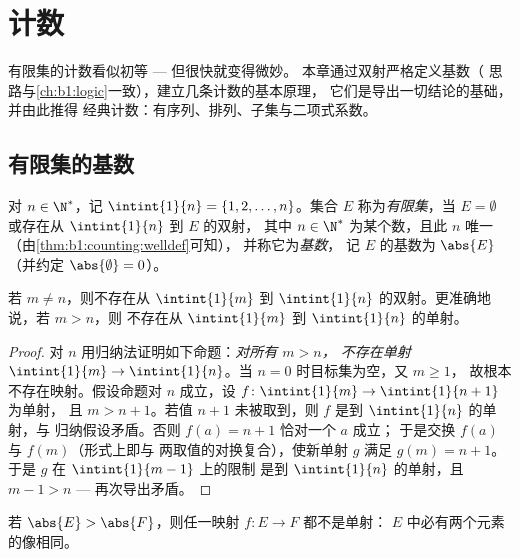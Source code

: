 \chapter{计数}\label{ch:b1:counting}

有限集的计数看似初等 --- 但很快就变得微妙。
本章通过双射严格定义基数（
思路与\cref{ch:b1:logic}一致），建立几条计数的基本原理，
它们是导出一切结论的基础，并由此推得
经典计数：有序列、排列、子集与二项式系数。

\section{有限集的基数}

\begin{definition}[有限集，基数]\label{def:b1:counting:card}
对 $n \in \N^*$，记 $\intint{1}{n} = \{1, 2, \dots,
n\}$。集合 $E$ 称为\emph{有限集}，当 $E = \emptyset$
或存在从 $\intint{1}{n}$ 到 $E$ 的双射，
其中 $n \in \N^*$ 为某个数，且此 $n$ 唯一（由\cref{thm:b1:counting:welldef}可知），
并称它为\emph{基数}，
记 $E$ 的基数为 $\abs{E}$（并约定 $\abs{\emptyset} = 0$）。
\end{definition}

\begin{theorem}[基数是良定义的]\label{thm:b1:counting:welldef}
若 $m \neq n$，则不存在从 $\intint{1}{m}$
到 $\intint{1}{n}$ 的双射。更准确地说，若 $m > n$，则
不存在从 $\intint{1}{m}$ 到 $\intint{1}{n}$ 的单射。
\end{theorem}

\begin{proof}
对 $n$ 用归纳法证明如下命题：\emph{对所有 $m > n$，
不存在单射 $\intint{1}{m} \to \intint{1}{n}$}。当 $n = 0$ 时目标集为空，又 $m \geq 1$，
故根本不存在映射。假设命题对 $n$ 成立，设 $f \colon
\intint{1}{m} \to \intint{1}{n+1}$ 为单射，
且 $m > n + 1$。若值 $n + 1$ 未被取到，则 $f$
是到 $\intint{1}{n}$ 的单射，与
归纳假设矛盾。否则 $f(a) = n + 1$ 恰对一个 $a$ 成立；
于是交换 $f(a)$ 与 $f(m)$（形式上即与
两取值的对换复合），使新单射 $g$ 满足 $g(m) = n + 1$。
于是 $g$ 在 $\intint{1}{m-1}$ 上的限制
是到 $\intint{1}{n}$ 的单射，且 $m - 1 > n$ ---
再次导出矛盾。
\end{proof}

\begin{corollary}[鸽巢原理]\label{cor:b1:counting:pigeonhole}
若 $\abs{E} > \abs{F}$，则任一映射 $f \colon E \to F$ 都不是单射：
$E$ 中必有两个元素的像相同。
\end{corollary}


